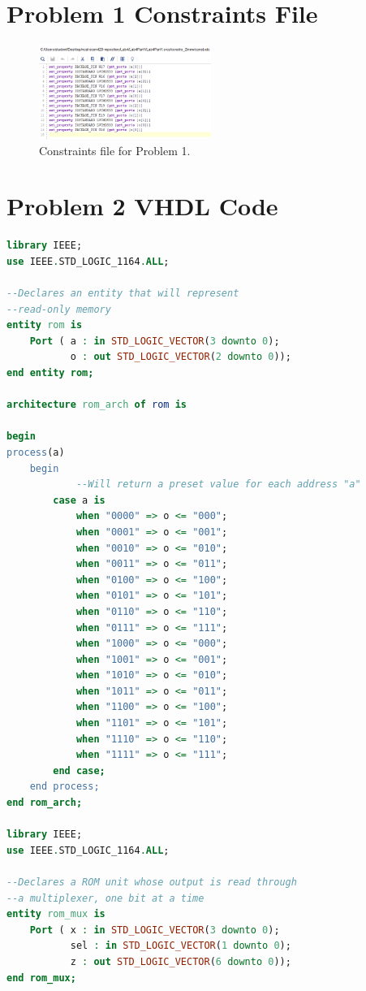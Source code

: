 \documentclass[11pt]{article}
\begin{document}
\begin{appendices}
\section{Problem 1 Constraints File}
\begin{figure}[H]
\begin{center}
	\includegraphics[width=0.5\textwidth]{../report-images/Part1Const.png}
	\caption{\label{fig:Part1ConstFile}Constraints file for Problem 1.}
\end{center}
\end{figure}

\section{Problem 2 VHDL Code}
\begin{lstlisting}[language=VHDL]
library IEEE;
use IEEE.STD_LOGIC_1164.ALL;

--Declares an entity that will represent
--read-only memory
entity rom is
    Port ( a : in STD_LOGIC_VECTOR(3 downto 0);
           o : out STD_LOGIC_VECTOR(2 downto 0));
end entity rom;

architecture rom_arch of rom is
    
begin
process(a)
    begin
    		--Will return a preset value for each address "a"
        case a is
            when "0000" => o <= "000";
            when "0001" => o <= "001";
            when "0010" => o <= "010";
            when "0011" => o <= "011";
            when "0100" => o <= "100";
            when "0101" => o <= "101";
            when "0110" => o <= "110";
            when "0111" => o <= "111";
            when "1000" => o <= "000";
            when "1001" => o <= "001";
            when "1010" => o <= "010";
            when "1011" => o <= "011";
            when "1100" => o <= "100";
            when "1101" => o <= "101";
            when "1110" => o <= "110";
            when "1111" => o <= "111";
        end case;
    end process;
end rom_arch;

library IEEE;
use IEEE.STD_LOGIC_1164.ALL;

--Declares a ROM unit whose output is read through
--a multiplexer, one bit at a time
entity rom_mux is
    Port ( x : in STD_LOGIC_VECTOR(3 downto 0);
           sel : in STD_LOGIC_VECTOR(1 downto 0);
           z : out STD_LOGIC_VECTOR(6 downto 0));
end rom_mux;


\end{lstlisting}
\end{appendices}
\end{document}
